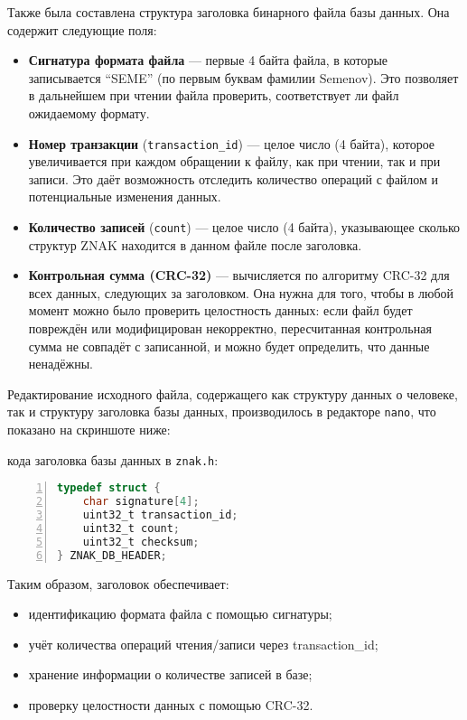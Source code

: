 Также была составлена структура заголовка бинарного файла базы данных. Она содержит следующие поля:
\begin{itemize}
  \item \textbf{Сигнатура формата файла} --- первые 4 байта файла, в которые записывается ``SEME'' (по первым буквам фамилии Semenov). Это позволяет в дальнейшем при чтении файла проверить, соответствует ли файл ожидаемому формату.
  
  \item \textbf{Номер транзакции} (\texttt{transaction\_id}) --- целое число (4 байта), которое увеличивается при каждом обращении к файлу, как при чтении, так и при записи. Это даёт возможность отследить количество операций с файлом и потенциальные изменения данных.
  
  \item \textbf{Количество записей} (\texttt{count}) --- целое число (4 байта), указывающее сколько структур ZNAK находится в данном файле после заголовка.
  
  \item \textbf{Контрольная сумма (CRC-32)} --- вычисляется по алгоритму CRC-32 для всех данных, следующих за заголовком. Она нужна для того, чтобы в любой момент можно было проверить целостность данных: если файл будет повреждён или модифицирован некорректно, пересчитанная контрольная сумма не совпадёт с записанной, и можно будет определить, что данные ненадёжны.
\end{itemize}

Редактирование исходного файла, содержащего как структуру данных о человеке, так и структуру заголовка базы данных, производилось в редакторе \texttt{nano}, что показано на скриншоте ниже:


 кода заголовка базы данных в \texttt{znak.h}:
\begin{lstlisting}[language=C, numbers=left, caption=Структура заголовка бинарного файла]
typedef struct {
    char signature[4];
    uint32_t transaction_id;
    uint32_t count;
    uint32_t checksum;
} ZNAK_DB_HEADER;
\end{lstlisting}

Таким образом, заголовок обеспечивает:
\begin{itemize}
  \item идентификацию формата файла с помощью сигнатуры;
  \item учёт количества операций чтения/записи через transaction\_id;
  \item хранение информации о количестве записей в базе;
  \item проверку целостности данных с помощью CRC-32.
\end{itemize}


